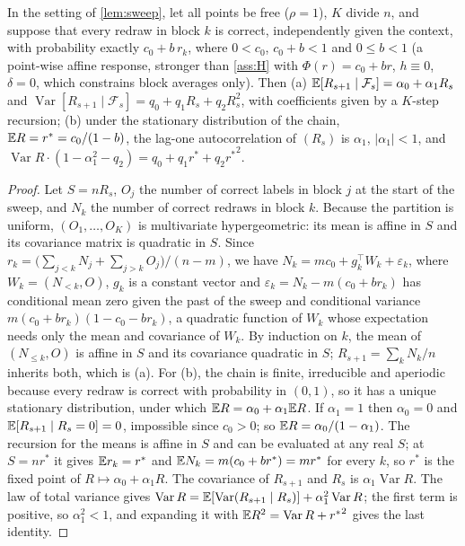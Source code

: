 \begin{proposition}\label{prop:moments}
In the setting of \cref{lem:sweep}, let all points be free ($\rho=1$), $K$ divide $n$, and suppose that every redraw in
block $k$ is correct, independently given the context, with probability exactly $c_0+b\,r_k$, where $0<c_0$,
$c_0+b<1$ and $0\le b<1$ (a point-wise affine response, stronger than \cref{ass:H} with $\Phi(r)=c_0+br$, $h\equiv0$,
$\delta=0$, which constrains block averages only). Then (a) $\mathbb{E}[R_{s+1}\mid\mathcal F_s]=\alpha_0+\alpha_1R_s$ and
$\operatorname{Var}[R_{s+1}\mid\mathcal F_s]=q_0+q_1R_s+q_2R_s^2$, with coefficients given by a $K$-step recursion; (b) under the
stationary distribution of the chain, $\mathbb{E} R=r^*=c_0/(1-b)$, the lag-one autocorrelation of $(R_s)$ is $\alpha_1$,
$\lvert\alpha_1\rvert<1$, and $\operatorname{Var}R\cdot(1-\alpha_1^2-q_2)=q_0+q_1r^*+q_2{r^*}^2$.
\end{proposition}
\begin{proof}
Let $S=nR_s$, $O_j$ the number of correct labels in block $j$ at the start of the sweep, and $N_k$ the number of
correct redraws in block $k$. Because the partition is uniform, $(O_1,\dots,O_K)$ is multivariate hypergeometric: its
mean is affine in $S$ and its covariance matrix is quadratic in $S$. Since
$r_k=\big(\sum_{j<k}N_j+\sum_{j>k}O_j\big)/(n-m)$, we have $N_k=mc_0+g_k^\top W_k+\varepsilon_k$, where $W_k=(N_{<k},O)$, $g_k$
is a constant vector and $\varepsilon_k=N_k-m(c_0+br_k)$ has conditional mean zero given the past of the sweep and
conditional variance $m(c_0+br_k)(1-c_0-br_k)$, a quadratic function of $W_k$ whose expectation needs only the mean and
covariance of $W_k$. By induction on $k$, the mean of $(N_{\le k},O)$ is affine in $S$ and its covariance quadratic in
$S$; $R_{s+1}=\sum_kN_k/n$ inherits both, which is (a). For (b), the chain is finite, irreducible and aperiodic because
every redraw is correct with probability in $(0,1)$, so it has a unique stationary distribution, under which
$\mathbb{E} R=\alpha_0+\alpha_1\mathbb{E} R$. If $\alpha_1=1$ then $\alpha_0=0$ and $\mathbb{E}[R_{s+1}\mid R_s=0]=0$, impossible since $c_0>0$; so
$\mathbb{E} R=\alpha_0/(1-\alpha_1)$. The recursion for the means is affine in $S$ and can be evaluated at any real $S$; at $S=nr^*$ it gives
$\mathbb{E} r_k=r^*$ and $\mathbb{E} N_k=m(c_0+br^*)=mr^*$ for every $k$, so $r^*$ is the fixed point of $R\mapsto\alpha_0+\alpha_1R$. The covariance of $R_{s+1}$ and $R_s$ is $\alpha_1\operatorname{Var}R$.
The law of total variance gives $\operatorname{Var}R=\mathbb{E}[\operatorname{Var}(R_{s+1}\mid R_s)]+\alpha_1^2\operatorname{Var}R$; the
first term is positive, so $\alpha_1^2<1$, and expanding it with $\mathbb{E} R^2=\operatorname{Var}R+{r^*}^2$ gives the last identity.
\end{proof}

